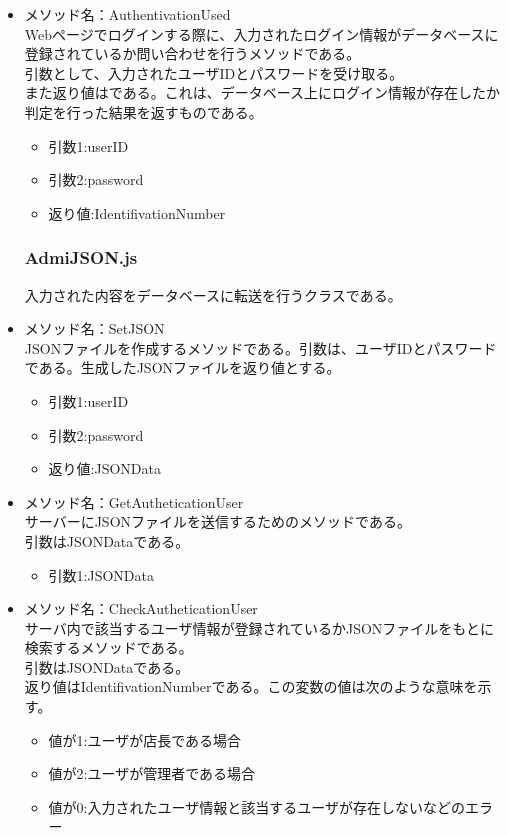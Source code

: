 \documentclass[a4j]{jarticle}
\begin{document}
\begin{itemize}

\item メソッド名：AuthentivationUsed\\
Webページでログインする際に、入力されたログイン情報がデータベースに登録されているか問い合わせを行うメソッドである。\\
引数として、入力されたユーザIDとパスワードを受け取る。\\
また返り値はである。これは、データベース上にログイン情報が存在したか判定を行った結果を返すものである。\\

	\begin{itemize}
		\item 引数1:userID
		\item 引数2:password
		\item 返り値:IdentifivationNumber
	\end{itemize}
	\subsubsection{AdmiJSON.js}
入力された内容をデータベースに転送を行うクラスである。
\item メソッド名：SetJSON\\

JSONファイルを作成するメソッドである。引数は、ユーザIDとパスワードである。生成したJSONファイルを返り値とする。
	\begin{itemize}
		\item 引数1:userID
		\item 引数2:password
		\item 返り値:JSONData
	\end{itemize}
\item メソッド名：GetAutheticationUser\\

サーバーにJSONファイルを送信するためのメソッドである。\\
引数はJSONDataである。
	\begin{itemize}
		\item 引数1:JSONData
	\end{itemize}
	
\item メソッド名：CheckAutheticationUser\\

サーバ内で該当するユーザ情報が登録されているかJSONファイルをもとに検索するメソッドである。\\
引数はJSONDataである。\\
返り値はIdentifivationNumberである。この変数の値は次のような意味を示す。
	\begin{itemize}
		\item 値が1:ユーザが店長である場合
		\item 値が2:ユーザが管理者である場合
		\item 値が0:入力されたユーザ情報と該当するユーザが存在しないなどのエラー
	\end{itemize}



\end{itemize}
\end{document}
